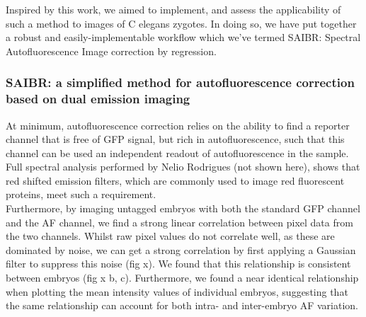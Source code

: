 \documentclass[12pt]{"article"}
\begin{document}
Inspired by this work, we aimed to implement, and assess the applicability of such a method to images of C elegans zygotes. In doing so, we have put together a robust and easily-implementable workflow which we’ve termed SAIBR: Spectral Autofluorescence Image correction by regression.\\


\subsubsection{SAIBR: a simplified method for autofluorescence correction based on dual emission imaging}


At minimum, autofluorescence correction relies on the ability to find a reporter channel that is free of GFP signal, but rich in autofluorescence, such that this channel can be used an independent readout of autofluorescence in the sample. Full spectral analysis performed by Nelio Rodrigues (not shown here), shows that red shifted emission filters, which are commonly used to image red fluorescent proteins, meet such a requirement.\\

Furthermore, by imaging untagged embryos with both the standard GFP channel and the AF channel, we find a strong linear correlation between pixel data from the two channels. Whilst raw pixel values do not correlate well, as these are dominated by noise, we can get a strong correlation by first applying a Gaussian filter to suppress this noise (fig x). We found that this relationship is consistent between embryos (fig x b, c). Furthermore, we found a near identical relationship when plotting the mean intensity values of individual embryos, suggesting that the same relationship can account for both intra- and inter-embryo AF variation. \\
\end{document}
